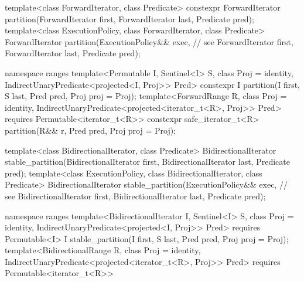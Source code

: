 \begin{codeblock}
  template<class ForwardIterator, class Predicate>
    constexpr ForwardIterator partition(ForwardIterator first,
                                        ForwardIterator last,
                                        Predicate pred);
  template<class ExecutionPolicy, class ForwardIterator, class Predicate>
    ForwardIterator partition(ExecutionPolicy&& exec, // see 
                              ForwardIterator first,
                              ForwardIterator last,
                              Predicate pred);
\end{codeblock}\begin{addedblock}\begin{codeblock}
  namespace ranges {
    template<Permutable I, Sentinel<I> S, class Proj = identity,
        IndirectUnaryPredicate<projected<I, Proj>> Pred>
      constexpr I
        partition(I first, S last, Pred pred, Proj proj = Proj{});
    template<ForwardRange R, class Proj = identity,
        IndirectUnaryPredicate<projected<iterator_t<R>, Proj>> Pred>
      requires Permutable<iterator_t<R>>
      constexpr safe_iterator_t<R>
        partition(R&& r, Pred pred, Proj proj = Proj{});
  }
\end{codeblock}\end{addedblock}\begin{codeblock}
  template<class BidirectionalIterator, class Predicate>
    BidirectionalIterator stable_partition(BidirectionalIterator first,
                                           BidirectionalIterator last,
                                           Predicate pred);
  template<class ExecutionPolicy, class BidirectionalIterator, class Predicate>
    BidirectionalIterator stable_partition(ExecutionPolicy&& exec, // see 
                                           BidirectionalIterator first,
                                           BidirectionalIterator last,
                                           Predicate pred);
\end{codeblock}\begin{addedblock}\begin{codeblock}
  namespace ranges {
    template<BidirectionalIterator I, Sentinel<I> S, class Proj = identity,
        IndirectUnaryPredicate<projected<I, Proj>> Pred>
      requires Permutable<I>
      I stable_partition(I first, S last, Pred pred, Proj proj = Proj{});
    template<BidirectionalRange R, class Proj = identity,
        IndirectUnaryPredicate<projected<iterator_t<R>, Proj>> Pred>
      requires Permutable<iterator_t<R>>
}
\end{codeblock}
\end{addedblock}
